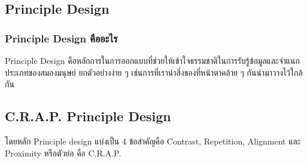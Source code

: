 \documentclass[14pt,oneside,openright,a4paper]{cpe-thai-project}
\begin{document}
\subsection{Principle Design}
  \subsubsection {Principle Design คืออะไร}
  Principle Design \cite{PrincipleDesign} คือหลักการในการออกแบบที่ช่วยให้เข้าใจธรรมชาติในการรับรู้ข้อมูลและจำแนกประเภทของสมองมนุษย์ ยกตัวอย่างง่าย ๆ เช่นการที่เรานำสิ่งของที่หน้าตาคล้าย ๆ กันนำมาวางไว้ใกล้กัน

  \newpage

\subsection {C.R.A.P. Principle Design}
  โดยหลัก Principle design แบ่งเป็น 4 ข้อสำคัญคือ Contrast, Repetition, Alignment และ Proximity หรือตัวย่อ คือ C.R.A.P.
\end{document}
